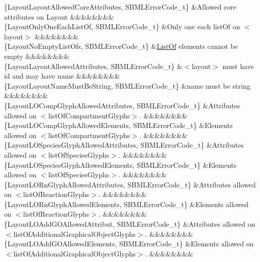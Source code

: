 \begin{DoxyParagraph}{}
\begin{longtabu}
\{Layout\+Layout\+Allowed\+Core\+Attributes, S\+B\+M\+L\+Error\+Code\+\_\+t\} &Allowed core attributes on Layout &&&&&&&&\\
\{Layout\+Only\+One\+Each\+List\+Of, S\+B\+M\+L\+Error\+Code\+\_\+t\} &Only one each list\+Of on {\ttfamily $<$layout$>$} &&&&&&&&\\
\{Layout\+No\+Empty\+List\+Ofs, S\+B\+M\+L\+Error\+Code\+\_\+t\} &\hyperlink{class_list_of}{List\+Of} elements cannot be empty &&&&&&&&\\
\{Layout\+Layout\+Allowed\+Attributes, S\+B\+M\+L\+Error\+Code\+\_\+t\} &{\ttfamily $<$layout$>$} must have \textquotesingle{}id\textquotesingle{} and may have \textquotesingle{}name\textquotesingle{} &&&&&&&&\\
\{Layout\+Layout\+Name\+Must\+Be\+String, S\+B\+M\+L\+Error\+Code\+\_\+t\} &\textquotesingle{}name\textquotesingle{} must be string &&&&&&&&\\
\{Layout\+L\+O\+Comp\+Glyph\+Allowed\+Attributes, S\+B\+M\+L\+Error\+Code\+\_\+t\} &Attributes allowed on {\ttfamily $<$list\+Of\+Compartment\+Glyphs$>$}. &&&&&&&&\\
\{Layout\+L\+O\+Comp\+Glyph\+Allowed\+Elements, S\+B\+M\+L\+Error\+Code\+\_\+t\} &Elements allowed on {\ttfamily $<$list\+Of\+Compartment\+Glyphs$>$}. &&&&&&&&\\
\{Layout\+L\+O\+Species\+Glyph\+Allowed\+Attributes, S\+B\+M\+L\+Error\+Code\+\_\+t\} &Attributes allowed on {\ttfamily $<$list\+Of\+Species\+Glyphs$>$}. &&&&&&&&\\
\{Layout\+L\+O\+Species\+Glyph\+Allowed\+Elements, S\+B\+M\+L\+Error\+Code\+\_\+t\} &Elements allowed on {\ttfamily $<$list\+Of\+Species\+Glyphs$>$}. &&&&&&&&\\
\{Layout\+L\+O\+Rn\+Glyph\+Allowed\+Attributes, S\+B\+M\+L\+Error\+Code\+\_\+t\} &Attributes allowed on {\ttfamily $<$list\+Of\+Reaction\+Glyphs$>$}. &&&&&&&&\\
\{Layout\+L\+O\+Rn\+Glyph\+Allowed\+Elements, S\+B\+M\+L\+Error\+Code\+\_\+t\} &Elements allowed on {\ttfamily $<$list\+Of\+Reaction\+Glyphs$>$}. &&&&&&&&\\
\{Layout\+L\+O\+Add\+G\+O\+Allowed\+Attribut, S\+B\+M\+L\+Error\+Code\+\_\+t\} &Attributes allowed on {\ttfamily $<$list\+Of\+Additional\+Graphical\+Object\+Glyphs$>$}. &&&&&&&&\\
\{Layout\+L\+O\+Add\+G\+O\+Allowed\+Elements, S\+B\+M\+L\+Error\+Code\+\_\+t\} &Elements allowed on {\ttfamily $<$list\+Of\+Additional\+Graphical\+Object\+Glyphs$>$}. &&&&&&&&\\

\end{longtabu}
\end{DoxyParagraph}
